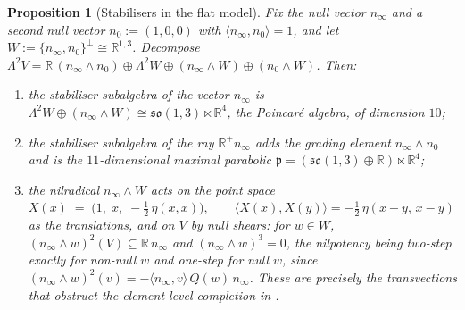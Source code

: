 \documentclass[11pt]{article}
\newtheorem{proposition}[theorem]{Proposition}
\theoremstyle{definition}
\theoremstyle{plain}
\newcommand{\changedmark}[2]{\marginpar{\raggedright\scriptsize\color{#1}#2}}
\providecommand{\R}{}\renewcommand{\R}{\mathbb{R}}
\providecommand{\nInf}{}\renewcommand{\nInf}{n_\infty}
\providecommand{\nO}{}\renewcommand{\nO}{n_0}
\providecommand{\ip}{}\renewcommand{\ip}[2]{\langle #1, #2\rangle}
\begin{document}
\begin{proposition}[Stabilisers in the flat model]\label{c:interior.stabilisers-flat-model}
\changedmark{gray}{reworded}
Fix the null vector $\nInf$ and a second null vector $\nO := (1,0,0)$ with $\ip{\nInf}{\nO} = 1$, and let $W := \{\nInf, \nO\}^\perp \cong \R^{1,3}$. Decompose $\Lambda^2 V = \R\,(\nInf \wedge \nO) \oplus \Lambda^2 W \oplus (\nInf \wedge W) \oplus (\nO \wedge W)$. Then:
\begin{enumerate}
\item the stabiliser subalgebra of the vector $\nInf$ is $\Lambda^2 W \oplus (\nInf \wedge W) \cong \mathfrak{so}(1,3) \ltimes \R^4$, the Poincar\'e algebra, of dimension $10$;
\item the stabiliser subalgebra of the ray $\R^+\nInf$ adds the grading element $\nInf \wedge \nO$ and is the $11$-dimensional maximal parabolic $\mathfrak{p} = (\mathfrak{so}(1,3) \oplus \R) \ltimes \R^4$;
\item the nilradical $\nInf \wedge W$ acts on the point space $X(x) \;=\; \bigl(1,\; x,\; -\tfrac12\,\eta(x,x)\bigr), \qquad \ip{X(x)}{X(y)} = -\tfrac12\,\eta(x - y,\, x - y)$ as the translations, and on $V$ by null shears: for $w \in W$, $(\nInf \wedge w)^2(V) \subseteq \R\,\nInf$ and $(\nInf \wedge w)^3 = 0$, the nilpotency being two-step exactly for non-null $w$ and one-step for null $w$, since $(\nInf \wedge w)^2(v) = -\ip{\nInf}{v}\,Q(w)\,\nInf$. These are precisely the transvections that obstruct the element-level completion in \cite[Thm.~4.2]{ButlerT1}.
\end{enumerate}
\end{proposition}
\end{document}
